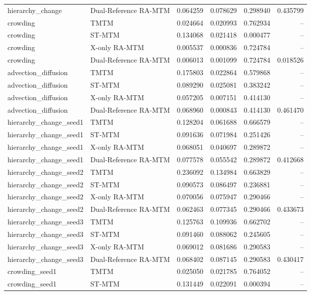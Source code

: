 \begin{tabular}{llrrrr}
hierarchy\_change & Dual-Reference RA-MTM & 0.064259 & 0.078629 & 0.298940 & 0.435799 \\
crowding & TMTM & 0.024664 & 0.020993 & 0.762934 & -- \\
crowding & ST-MTM & 0.134068 & 0.021418 & 0.000477 & -- \\
crowding & X-only RA-MTM & 0.005537 & 0.000836 & 0.724784 & -- \\
crowding & Dual-Reference RA-MTM & 0.006013 & 0.001099 & 0.724784 & 0.018526 \\
advection\_diffusion & TMTM & 0.175803 & 0.022864 & 0.579868 & -- \\
advection\_diffusion & ST-MTM & 0.089290 & 0.025081 & 0.383242 & -- \\
advection\_diffusion & X-only RA-MTM & 0.057205 & 0.007151 & 0.414130 & -- \\
advection\_diffusion & Dual-Reference RA-MTM & 0.068960 & 0.000843 & 0.414130 & 0.461470 \\
hierarchy\_change\_seed1 & TMTM & 0.128204 & 0.061688 & 0.666579 & -- \\
hierarchy\_change\_seed1 & ST-MTM & 0.091636 & 0.071984 & 0.251426 & -- \\
hierarchy\_change\_seed1 & X-only RA-MTM & 0.068051 & 0.040697 & 0.289872 & -- \\
hierarchy\_change\_seed1 & Dual-Reference RA-MTM & 0.077578 & 0.055542 & 0.289872 & 0.412668 \\
hierarchy\_change\_seed2 & TMTM & 0.236092 & 0.134984 & 0.663829 & -- \\
hierarchy\_change\_seed2 & ST-MTM & 0.090573 & 0.086497 & 0.236881 & -- \\
hierarchy\_change\_seed2 & X-only RA-MTM & 0.070056 & 0.075947 & 0.290466 & -- \\
hierarchy\_change\_seed2 & Dual-Reference RA-MTM & 0.062463 & 0.077345 & 0.290466 & 0.433673 \\
hierarchy\_change\_seed3 & TMTM & 0.125763 & 0.109936 & 0.662702 & -- \\
hierarchy\_change\_seed3 & ST-MTM & 0.091460 & 0.088062 & 0.245605 & -- \\
hierarchy\_change\_seed3 & X-only RA-MTM & 0.069012 & 0.081686 & 0.290583 & -- \\
hierarchy\_change\_seed3 & Dual-Reference RA-MTM & 0.068402 & 0.087145 & 0.290583 & 0.430417 \\
crowding\_seed1 & TMTM & 0.025050 & 0.021785 & 0.764052 & -- \\
crowding\_seed1 & ST-MTM & 0.131449 & 0.022091 & 0.000394 & -- \\

\end{tabular}
